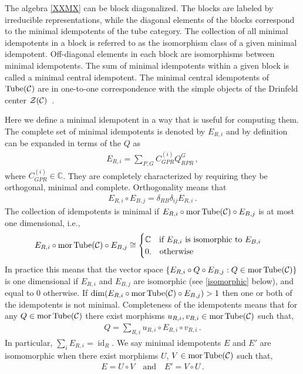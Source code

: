 The algebra \eqref{XXMX} can be block diagonalized. The blocks are labeled by irreducible representations, while the diagonal elements of the blocks correspond to the minimal idempotents of the tube category. The collection of all minimal idempotents in a block is referred to as the isomorphism class of a given minimal idempotent.
Off-diagonal elements in each block are isomorphisms between minimal idempotents. 
The sum of minimal idempotents within a given block is called a minimal central idempotent. 
The minimal central idempotents of $\operatorname{Tube}(\mathcal{C})$ are in one-to-one correspondence with the simple objects of the Drinfeld center $\mathcal{Z}(\mathcal{C})$~\cite{Muger2003}. 


Here we define a minimal idempotent in a way that is useful for computing them.
The complete set of minimal idempotents is denoted by $E_{R,i}$ and by definition can be expanded in terms of the $Q$ as
\begin{align} 
E_{R,i} = \sum_{P,G}C_{GPR}^{(i)} Q_{RPR}^G \,,
\end{align}
where $C_{GPR}^{(i)} \in \mathbb{C}$.
They are completely characterized by requiring they be orthogonal, minimal and complete.
Orthogonality means that
\begin{align}
E_{R,i} \circ E_{B,j} = \delta_{RB} \delta_{ij} E_{R,i} \,.
\label{idempconda}
\end{align}
The collection of idempotents is minimal if $E_{R,i}\circ \operatorname{mor}\operatorname{Tube}(\mathcal{C}) \circ E_{B,j}$ is at most one dimensional, i.e.,
\begin{align}
	E_{R,i}\circ \operatorname{mor}\operatorname{Tube}(\mathcal{C}) \circ E_{B,j} \cong  
\begin{cases} 
\mathbb{C} \quad \text{if $E_{R,i}$ is isomorphic to $E_{B,i}$}\\
0. \quad  \text{otherwise}\\
\end{cases}
\label{idempcondb}
\end{align}
In practice this means that the vector space $\{ E_{R,i}\circ  Q \circ E_{B,j} : Q \in \operatorname{mor}\operatorname{Tube}(\mathcal{C}) \}$ is one dimensional if $E_{R,i}$ and $E_{B,j}$ are isomorphic (see \eqref{isomorphic} below), and equal to $0$ otherwise. 
If $\dim(E_{R,i}\circ \operatorname{mor}\operatorname{Tube}(\mathcal{C}) \circ E_{B,j}) >1$ then one or both of the idempotents is not minimal.
Completeness of the idempotents means that for any $Q \in \operatorname{mor}\operatorname{Tube}(\mathcal{C})$ there exist morphisms $u_{R,i},v_{R,i} \in \operatorname{mor}\operatorname{Tube}(\mathcal{C})$ such that, 
\begin{align} 
Q = \sum_{R,i} u_{R,i} \circ E_{R,i} \circ v_{R,i} \,.
\end{align}
In particular, $\sum_{i}E_{R,i} = \operatorname{id}_R$.
We say minimal idempotents $E$ and $E'$ are isomomorphic when there exist morphisms $U$, $V \in \operatorname{mor}\operatorname{Tube}(\mathcal{C})$ such that,
\begin{align}
\label{isomorphic}
E = U \circ V \quad \text{and} \quad E' = V \circ U \,.
\end{align}

